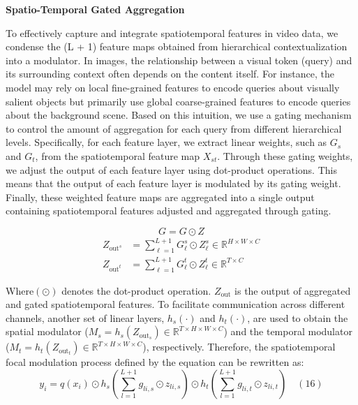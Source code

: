 \documentclass[conference,a4paper,english]{IEEEtran}[2015/08/26]
\begin{document}
\textbf{Spatio-Temporal Gated Aggregation}

To effectively capture and integrate spatiotemporal features in video data, 
we condense the (L + 1) feature maps obtained from hierarchical contextualization into a modulator. 
In images, the relationship between a visual token (query) and its surrounding context often depends on the content itself.
 For instance, the model may rely on local fine-grained features to encode queries about visually salient 
 objects but primarily use global coarse-grained features to encode queries about the background scene.
Based on this intuition, we use a gating mechanism to control the amount of aggregation for each query from
different hierarchical levels. Specifically, for each feature layer, we extract linear weights, 
such as \(G_s\) and \(G_t\), from the spatiotemporal feature map \(X_{st}\). Through these gating weights,
we adjust the output of each feature layer using dot-product operations. 
This means that the output of each feature layer is modulated by its gating weight. 
Finally, these weighted feature maps are aggregated into a single output containing spatiotemporal features 
adjusted and aggregated through gating.

\[
G = G \odot Z\tag{13}
\]
\begin{align*}
  Z_{\text{out}^s} &= \sum_{\ell=1}^{L+1} G_{\ell}^s \odot Z_{\ell}^s \in \mathbb{R}^{H \times W \times C}\tag{14} \\
  Z_{\text{out}^t} &= \sum_{\ell=1}^{L+1} G_{\ell}^t \odot Z_{\ell}^t \in \mathbb{R}^{T \times C}\tag{15}
\end{align*}

Where$(\odot)$ denotes the dot-product operation. \(Z_{\text{out}}\) is the output of aggregated and gated spatiotemporal features.
To facilitate communication across different channels, another set of linear layers, \(h_s(\cdot)\) and \(h_t(\cdot)\), are used to obtain the spatial modulator (\(M_s = h_s(Z_{\text{out}_s}) \in \mathbb{R}^{T \times H \times W \times C}\)) and the temporal modulator (\(M_t = h_t(Z_{\text{out}_t}) \in \mathbb{R}^{T \times H \times W \times C}\)), respectively. Therefore, the spatiotemporal focal modulation process defined by the equation can be rewritten as:
\[ y_i = q(x_i) \odot h_s\left(\sum_{l=1}^{L+1} g_{li,s} \odot z_{li,s}\right) \odot h_t\left(\sum_{l=1}^{L+1} g_{li,t} \odot z_{li,t}\right) \quad (16) \]
\end{document}

